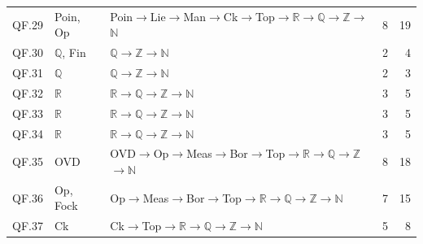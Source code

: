 {\begin{longtable}{l p{4.6cm} p{7.4cm} r r}
QF.29 & \textsf{Poin}, \textsf{Op} & \textsf{Poin}$\to$\textsf{Lie}$\to$\textsf{Man}$\to$\textsf{Ck}$\to$\textsf{Top}$\to$$\mathbb R$$\to$$\mathbb Q$$\to$$\mathbb Z$$\to$$\mathbb N$ & 8 & 19 \\
QF.30 & $\mathbb Q$, \textsf{Fin} & $\mathbb Q$$\to$$\mathbb Z$$\to$$\mathbb N$ & 2 & 4 \\
QF.31 & $\mathbb Q$ & $\mathbb Q$$\to$$\mathbb Z$$\to$$\mathbb N$ & 2 & 3 \\
QF.32 & $\mathbb R$ & $\mathbb R$$\to$$\mathbb Q$$\to$$\mathbb Z$$\to$$\mathbb N$ & 3 & 5 \\
QF.33 & $\mathbb R$ & $\mathbb R$$\to$$\mathbb Q$$\to$$\mathbb Z$$\to$$\mathbb N$ & 3 & 5 \\
QF.34 & $\mathbb R$ & $\mathbb R$$\to$$\mathbb Q$$\to$$\mathbb Z$$\to$$\mathbb N$ & 3 & 5 \\
QF.35 & \textsf{OVD} & \textsf{OVD}$\to$\textsf{Op}$\to$\textsf{Meas}$\to$\textsf{Bor}$\to$\textsf{Top}$\to$$\mathbb R$$\to$$\mathbb Q$$\to$$\mathbb Z$$\to$$\mathbb N$ & 8 & 18 \\
QF.36 & \textsf{Op}, \textsf{Fock} & \textsf{Op}$\to$\textsf{Meas}$\to$\textsf{Bor}$\to$\textsf{Top}$\to$$\mathbb R$$\to$$\mathbb Q$$\to$$\mathbb Z$$\to$$\mathbb N$ & 7 & 15 \\
QF.37 & \textsf{Ck} & \textsf{Ck}$\to$\textsf{Top}$\to$$\mathbb R$$\to$$\mathbb Q$$\to$$\mathbb Z$$\to$$\mathbb N$ & 5 & 8 \\
\end{longtable}
}
